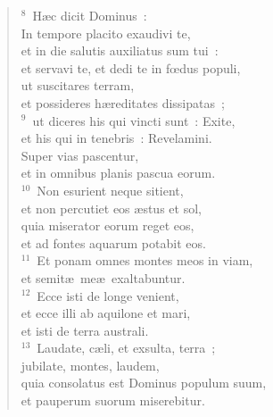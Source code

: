 \begin{flushleft}\begin{verse}${}^{8}$~H\ae c dicit Dominus~:\\ In tempore placito exaudivi te,\\ et in die salutis auxiliatus sum tui~:\\ et servavi te, et dedi te in fœdus populi,\\ ut suscitares terram,\\ et possideres h\ae reditates dissipatas~;\\
${}^{9}$~ut diceres his qui vincti sunt~: Exite,\\ et his qui in tenebris~: Revelamini.\\ Super vias pascentur,\\ et in omnibus planis pascua eorum.\\
${}^{10}$~Non esurient neque sitient,\\ et non percutiet eos \ae stus et sol,\\ quia miserator eorum reget eos,\\ et ad fontes aquarum potabit eos.\\
${}^{11}$~Et ponam omnes montes meos in viam,\\ et semit\ae\ me\ae\ exaltabuntur.\\
${}^{12}$~Ecce isti de longe venient,\\ et ecce illi ab aquilone et mari,\\ et isti de terra australi.\\
${}^{13}$~Laudate, c\ae li, et exsulta, terra~;\\ jubilate, montes, laudem,\\ quia consolatus est Dominus populum suum,\\ et pauperum suorum miserebitur.\end{verse}\end{flushleft}


